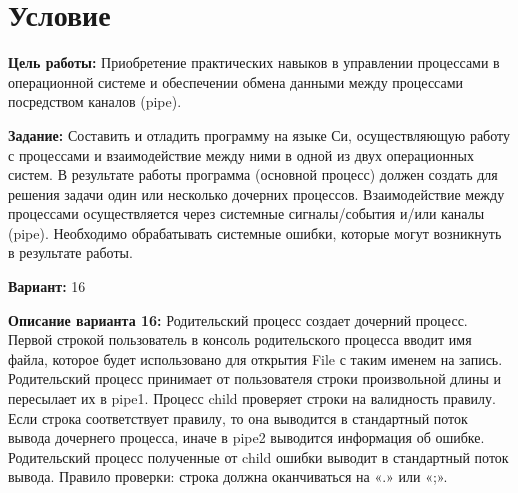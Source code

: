 \section{Условие}
{\bfseries Цель работы:}
Приобретение практических навыков в управлении процессами в операционной системе и обеспечении обмена данными между процессами посредством каналов (pipe).

{\bfseries Задание:}
Составить и отладить программу на языке Си, осуществляющую работу с процессами и взаимодействие между ними в одной из двух операционных систем. В результате работы программа (основной процесс) должен создать для решения задачи один или несколько дочерних процессов. Взаимодействие между процессами осуществляется через системные сигналы/события и/или каналы (pipe). Необходимо обрабатывать системные ошибки, которые могут возникнуть в результате работы.

{\bfseries Вариант:} 16

{\bfseries Описание варианта 16:}
Родительский процесс создает дочерний процесс. Первой строкой пользователь в консоль родительского процесса вводит имя файла, которое будет использовано для открытия File с таким именем на запись. Родительский процесс принимает от пользователя строки произвольной длины и пересылает их в pipe1. Процесс child проверяет строки на валидность правилу. Если строка соответствует правилу, то она выводится в стандартный поток вывода дочернего процесса, иначе в pipe2 выводится информация об ошибке. Родительский процесс полученные от child ошибки выводит в стандартный поток вывода. Правило проверки: строка должна оканчиваться на «.» или «;».

